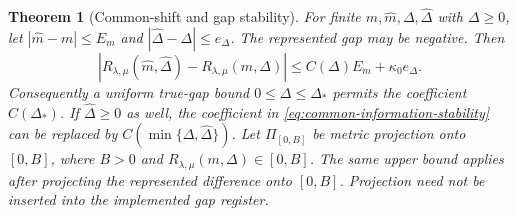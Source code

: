 \documentclass[11pt]{article}
\newtheorem{theorem}{Theorem}
\begin{document}
\begin{theorem}[Common-shift and gap stability]
\label{thm:common-information-stability}
For finite $m,\widehat m,\Delta,\widehat\Delta$ with $\Delta\geq0$, let
$|\widehat m-m|\leq E_m$ and
$|\widehat\Delta-\Delta|\leq e_\Delta$. The represented gap may be
negative. Then
\begin{equation}
 |R_{\lambda,\mu}(\widehat m,\widehat\Delta)
                       -R_{\lambda,\mu}(m,\Delta)|
 \leq C(\Delta)E_m+\kappa_0e_\Delta.
 \label{eq:common-information-stability}
\end{equation}
Consequently a uniform true-gap bound $0\leq\Delta\leq\Delta_*$ permits
the coefficient $C(\Delta_*)$. If $\widehat\Delta\geq0$ as well, the
coefficient in \eqref{eq:common-information-stability} can be replaced
by $C(\min\{\Delta,\widehat\Delta\})$.
Let $\Pi_{[0,B]}$ be metric projection onto $[0,B]$, where $B>0$ and
$R_{\lambda,\mu}(m,\Delta)\in[0,B]$. The same upper bound applies after
projecting the represented difference onto $[0,B]$. Projection need not
be inserted into the implemented gap register.
\end{theorem}
\end{document}

